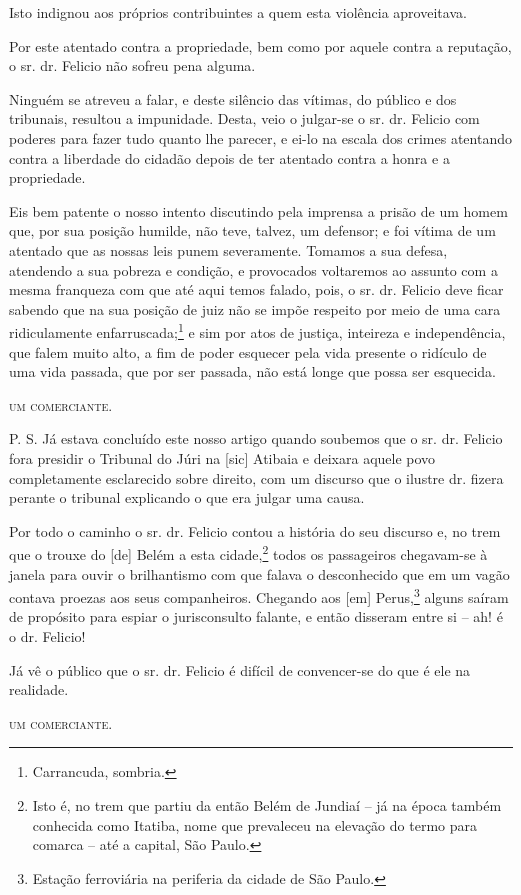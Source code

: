 Isto indignou aos próprios contribuintes a quem esta violência
aproveitava.

Por este atentado contra a propriedade, bem como por aquele contra a
reputação, o sr. dr. Felicio não sofreu pena alguma.

Ninguém se atreveu a falar, e deste silêncio das vítimas, do público e
dos tribunais, resultou a impunidade. Desta, veio o julgar-se o sr. dr.
Felicio com poderes para fazer tudo quanto lhe parecer, e ei-lo na
escala dos crimes atentando contra a liberdade do cidadão depois de ter
atentado contra a honra e a propriedade.

Eis bem patente o nosso intento discutindo pela imprensa a prisão de um
homem que, por sua posição humilde, não teve, talvez, um defensor; e foi
vítima de um atentado que as nossas leis punem severamente. Tomamos a
sua defesa, atendendo a sua pobreza e condição, e provocados voltaremos
ao assunto com a mesma franqueza com que até aqui temos falado, pois, o
sr. dr. Felicio deve ficar sabendo que na sua posição de juiz não se
impõe respeito por meio de uma cara ridiculamente
enfarruscada;\footnote{ Carrancuda, sombria.} e sim por atos de
justiça, inteireza e independência, que falem muito alto, a fim de poder
esquecer pela vida presente o ridículo de uma vida passada, que por ser
passada, não está longe que possa ser esquecida.
\begin{flushright}
\textsc{um comerciante}.
\end{flushright}
P. S. Já estava concluído este nosso artigo quando soubemos que o sr.
dr. Felicio fora presidir o Tribunal do Júri na {[}sic{]} Atibaia e
deixara aquele povo completamente esclarecido sobre direito, com um
discurso que o ilustre dr. fizera perante o tribunal explicando o que
era julgar uma causa.

Por todo o caminho o sr. dr. Felicio contou a história do seu discurso
e, no trem que o trouxe do {[}de{]} Belém a esta cidade,\footnote{ Isto
  é, no trem que partiu da então Belém de Jundiaí -- já na época também
  conhecida como Itatiba, nome que prevaleceu na elevação do termo para
  comarca -- até a capital, São Paulo.} todos os passageiros chegavam-se
à janela para ouvir o brilhantismo com que falava o desconhecido que em
um vagão contava proezas aos seus companheiros. Chegando aos {[}em{]}
Perus,\footnote{ Estação ferroviária na periferia da cidade de São
  Paulo.} alguns saíram de propósito para espiar o jurisconsulto
falante, e então disseram entre si -- ah! é o dr. Felicio!

Já vê o público que o sr. dr. Felicio é difícil de convencer-se do que é
ele na realidade.
\begin{flushright}
\textsc{um comerciante}.
\end{flushright}
